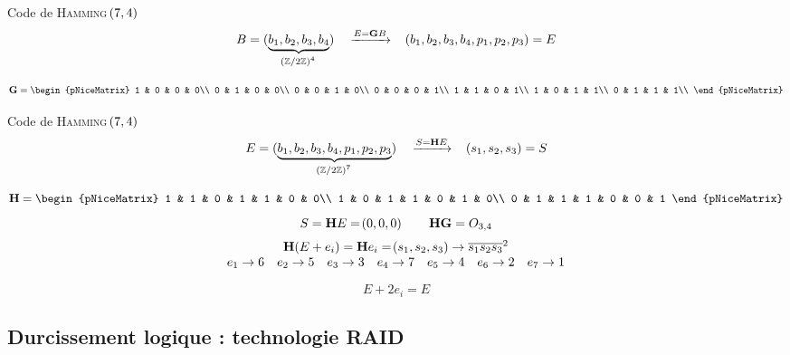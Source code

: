 \documentclass[french,bookmarks,aspectratio=43]{beamer}
\newcommand{\bdZ}{\mathbb{Z}}
\newcommand{\bbG}{\mathbf{G}}
\newcommand{\bbH}{\mathbf{H}}
\begin{document}
\begin{frame}{Code de \textsc{Hamming} $\!\left(7, 4\right)$}
    \[ B = (\underbrace{b_1, b_2, b_3, b_4}_{\p{\bdZ/2\bdZ}^4}) \quad \xrightarrow{E = \bbG B} \quad \p{b_1, b_2, b_3, b_4, p_1, p_2, p_3} = E\]\pause

    \[ \bbG = \begin{pNiceMatrix}
        1 & 0 & 0 & 0\\
        0 & 1 & 0 & 0\\
        0 & 0 & 1 & 0\\
        0 & 0 & 0 & 1\\
        1 & 1 & 0 & 1\\
        1 & 0 & 1 & 1\\
        0 & 1 & 1 & 1\\
        \end{pNiceMatrix} \]

    
\end{frame}

\begin{frame}{Code de \textsc{Hamming} $\!\left(7, 4\right)$}
    \[ E = (\underbrace{b_1, b_2, b_3, b_4, p_1, p_2, p_3}_{\p{\bdZ/2\bdZ}^7}) \quad \xrightarrow{S = \bbH E} \quad \p{s_1, s_2, s_3} = S\]\pause

    \[ \bbH = \begin{pNiceMatrix}
        1 & 1 & 0 & 1 & 1 & 0 & 0\\
        1 & 0 & 1 & 1 & 0 & 1 & 0\\
        0 & 1 & 1 & 1 & 0 & 0 & 1
        \end{pNiceMatrix} \]\pause
    \[ S = \bbH E = \p{0, 0, 0} \qquad \bbH \bbG = O_{3, 4}\]\pause
    \[ \begin{array}{c}
        \bbH \p{E + e_i} = \bbH e_i = \p{s_1, s_2, s_3} \to \overline{s_1s_2s_3}^2\\
        e_1 \to 6\quad e_2 \to 5\quad e_3 \to 3\quad e_4 \to 7\quad e_5 \to 4 \quad e_6 \to 2\quad e_7 \to 1
    \end{array} \]\pause

    \[ E + 2 e_i = E\]
\end{frame}

\subsection{Durcissement logique : technologie RAID}
\end{document}
